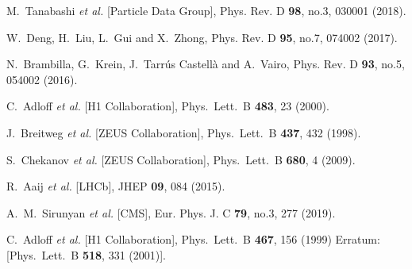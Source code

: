\documentclass[prd,amsmath,twocolumn,floatfix,amssymb, preprintnumbers, linenumbers,nofootinbib, superscriptaddress]{revtex4}
\begin{document}
\begin{thebibliography}{99}
M.~Tanabashi \textit{et al.} [Particle Data Group],
Phys. Rev. D \textbf{98}, no.3, 030001 (2018). 


W.~Deng, H.~Liu, L.~Gui and X.~Zhong,
Phys. Rev. D \textbf{95}, no.7, 074002 (2017). 

N.~Brambilla, G.~Krein, J.~Tarrús Castellà and A.~Vairo,
Phys. Rev. D \textbf{93}, no.5, 054002 (2016).

 
  C.~Adloff {\it et al.} [H1 Collaboration],
  Phys.\ Lett.\ B {\bf 483}, 23 (2000).



  J.~Breitweg {\it et al.} [ZEUS Collaboration],
  Phys.\ Lett.\ B {\bf 437}, 432 (1998).
 

  S.~Chekanov {\it et al.} [ZEUS Collaboration],
  Phys.\ Lett.\ B {\bf 680}, 4 (2009).
 

R.~Aaij {\it et al.} [LHCb],
JHEP \textbf{09}, 084 (2015). 


A.~M.~Sirunyan {\it et al.} [CMS],
Eur. Phys. J. C \textbf{79}, no.3, 277 (2019). 


  C.~Adloff {\it et al.} [H1 Collaboration],
  Phys.\ Lett.\ B {\bf 467}, 156 (1999)
  Erratum: [Phys.\ Lett.\ B {\bf 518}, 331 (2001)].
 


\end{thebibliography}
\end{document}
